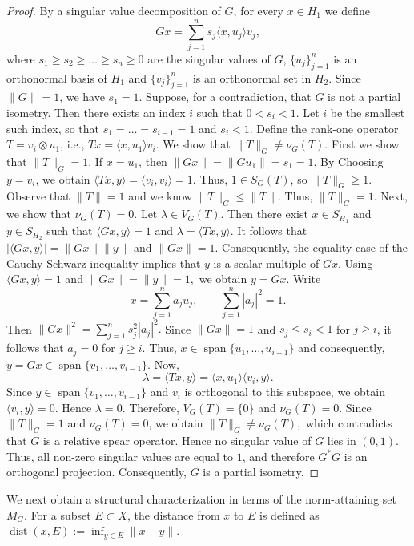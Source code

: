 \documentclass[12pt]{amsart}
\theoremstyle{definition}
\numberwithin{equation}{section}
\begin{document}
	\begin{proof}
		By a singular value decomposition of $G$, for every $x\in H_1$ we define
		\[
		Gx=\sum_{j=1}^{n} s_j \langle x,u_j\rangle v_j,
		\]
		where $s_1\ge s_2\ge\dots\ge s_n\ge0$ are the singular values of $G$, $\{u_j\}_{j=1}^n$ is an orthonormal basis of $H_1$ and $\{v_j\}_{j=1}^n$ is an orthonormal set in $H_2$. Since $\|G\|=1$, we have $s_1=1$. Suppose, for a contradiction, that $G$ is not a partial isometry. Then there exists an index $i$ such that $0<s_{i}<1$. Let $i$ be the smallest such index, so that $s_{1}=\dots =s_{i-1}=1$ and $s_{i}<1$. Define the rank-one operator $T=v_{i}\otimes u_{1}$, i.e., $Tx=\langle x,u_{1}\rangle v_{i}$. We show that $\|T\|_G\neq \nu_{G}(T)$. First we show that $\|T\|_{G}=1$. If $x=u_1$, then $\|Gx\|=\|Gu_1\|=s_1=1$. By Choosing $y=v_i$, we obtain $\langle Tx,y\rangle      =\langle v_i,v_i\rangle =1.$ Thus, $1\in S_G(T)$, so $\|T\|_G \ge 1$. Observe that $\|T\|=1$ and we know $\|T\|_{G}\le\|T\|$. Thus, $\|T\|_{G}=1$. Next, we show that $\nu_{G}(T)=0$. Let $\lambda\in V_G(T)$. Then there exist $x\in S_{H_1}$ and $y\in S_{H_2}$ such that $\langle Gx,y\rangle=1$ and $\lambda=\langle Tx, y\rangle.$ It follows that $|\langle Gx, y\rangle|=\|Gx\|\|y\|$ and $\|Gx\|=1$. Consequently, the equality case of the Cauchy-Schwarz inequality implies that $y$ is a scalar multiple of $Gx$. Using $\langle Gx, y\rangle=1$ and $\|Gx\|=\|y\|=1,$ we obtain $y=Gx$. Write
		\[
		x=\sum_{j=1}^n a_j u_j ,
		\qquad \sum_{j=1}^n |a_j|^2=1 .
		\]
		Then $\|Gx\|^2=\sum_{j=1}^n s_j^2 |a_j|^2.$ Since $\|Gx\|=1$ and $s_j\le s_i<1$ for $j\ge i$, it follows that $a_j=0$ for $j\ge i$. Thus, $x\in \operatorname{span}\{u_1,\dots,u_{i-1}\}$ and consequently, $y=Gx\in \operatorname{span}\{v_1,\dots,v_{i-1}\}.$ Now,
		\[
		\lambda=\langle Tx,y\rangle =\langle x,u_1\rangle \langle v_i,y\rangle .
		\]
		Since $y\in\operatorname{span}\{v_1,\dots,v_{i-1}\}$ and $v_i$ is orthogonal to this subspace, we obtain $\langle v_i, y\rangle=0.$ Hence $\lambda=0$. Therefore, $V_G(T)=\{0\}$ and $\nu_G(T)=0$. Since $\|T\|_G=1$ and $\nu_G(T)=0$, we obtain $\|T\|_G\ne \nu_G(T),$ which contradicts that $G$ is a relative spear operator. Hence no singular value of $G$ lies in $(0,1)$. Thus, all non-zero singular values are equal to $1$, and therefore $G^*G$ is an orthogonal projection. Consequently, $G$ is a partial isometry.
	\end{proof}
	
	We next obtain a structural characterization in terms of the norm-attaining set $M_G$. For a subset $E \subset X$, the distance from $x$ to $E$ is defined as $\operatorname{dist}(x,E):=\inf_{y\in E}\|x-y\|.$
	
\end{document}
